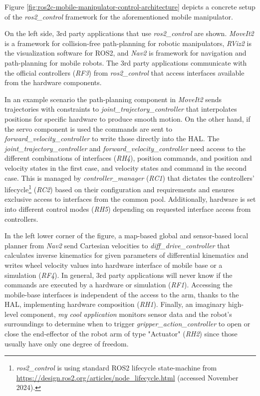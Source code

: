 \documentclass[journal]{IEEEtran}
\newcommand{\comment}[1]{}
\begin{document}
Figure \ref{fig:ros2c-mobile-manipulator-control-architecture} depicts a concrete setup of the \emph{ros2\_control} framework for the aforementioned mobile manipulator.
\comment{The different symbols in the legend show different hardware interface types, which can be claimed by any controller with a compatible connecting interface type.}
On the left side, 3rd party applications that use \emph{ros2\_control} are shown. \emph{MoveIt2} is a framework for collision-free path-planning for robotic manipulators, \emph{RViz2} is the visualization software for ROS2, and \emph{Nav2} is framework for navigation and path-planning for mobile robots.
The 3rd party applications communicate with the official controllers (\emph{RF3}) from \emph{ros2\_control} that access interfaces available from the hardware components.

In an example scenario the path-planning component in \emph{MoveIt2} sends  trajectories with constraints to \emph{joint\_trajectory\_controller} that interpolates positions for specific hardware to produce smooth motion.
On the other hand, if the servo component is used the commands are sent to \emph{forward\_velocity\_controller} to write those directly into the HAL.
The \emph{joint\_trajectory\_controller} and \emph{forward\_velocity\_controller} need access to the different combinations of interfaces (\emph{RH4}), position commands, and position and velocity states in the first case, and velocity states and command in the second case.
This is managed by \emph{controller\_manager} (\emph{RC1}) that dictates the controllers' lifecycle\footnote{\emph{ros2\_control} is using standard ROS2 lifecycle state-machine from \url{https://design.ros2.org/articles/node\_lifecycle.html} (accessed November 2024).} (\emph{RC2}) based on their configuration and requirements and ensures exclusive access to interfaces from the common pool.
Additionally, hardware is set into different control modes (\emph{RH5}) depending on requested interface access from controllers.

In the left lower corner of the figure, a map-based global and sensor-based local planner from \emph{Nav2} send Cartesian velocities to \emph{diff\_drive\_controller} that calculates inverse kinematics for given parameters of differential kinematics and writes wheel velocity values into hardware interface of mobile base or a simulation (\emph{RF4}).
In general, 3rd party applications will never know if the commands are executed by a hardware or simulation (\emph{RF1}).
Accessing the mobile-base interfaces is independent of the access to the arm, thanks to the HAL, implementing hardware composition (\emph{RH1}).
Finally, an imaginary high-level component, \emph{my cool application} monitors sensor data and the robot's surroundings to determine when to trigger \emph{gripper\_action\_controller} to open or close the end-effector of the robot arm of type "Actuator" (\emph{RH2}) since those usually have only one degree of freedom.
\end{document}
